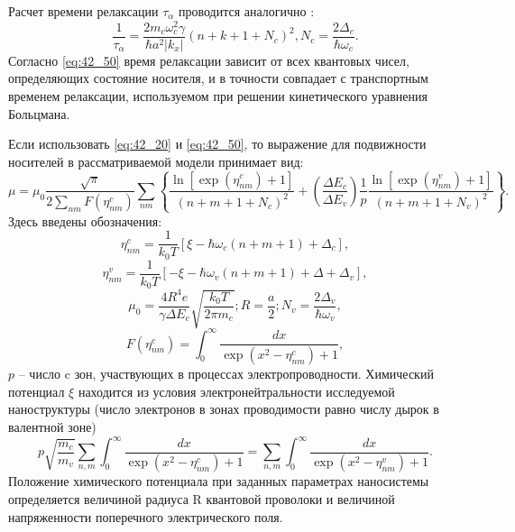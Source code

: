 Расчет времени релаксации $\tau _{\alpha } $ проводится аналогично \cite{Karapetyan2011}:
\begin{equation} \label{eq:42_50}
\frac{1}{\tau _{\alpha } } =\frac{2m_{c} \omega _{c}^{2} \gamma }{\hbar a^{2} \left|k_{x} \right|} \left(n+k+1+N_{c} \right)^{2} , N_{c} =\frac{2\Delta _{c} }{\hbar \omega _{c} } .
\end{equation} 
Согласно \eqref{eq:42_50} время релаксации зависит от всех квантовых чисел, определяющих состояние носителя, и в точности совпадает с транспортным временем релаксации, используемом при решении кинетического уравнения Больцмана.

Если использовать \eqref{eq:42_20} и \eqref{eq:42_50}, то выражение для подвижности носителей в рассматриваемой модели принимает вид:
\begin{equation} \label{eq:42_60}
\mu =\mu _{0} \frac{\sqrt{\pi } }{2\sum _{nm}F(\eta _{nm}^{c} ) } \sum _{nm}\left\{\frac{\ln \left[\exp \left(\eta _{nm}^{c} \right)+1\right]}{\left(n+m+1+N_{c} \right)^{2} } +\left(\frac{\Delta E_{c} }{\Delta E_{v} } \right)\frac{1}{p} \frac{\ln \left[\exp \left(\eta _{nm}^{v} \right)+1\right]}{\left(n+m+1+N_{v} \right)^{2} } \right\} . 
\end{equation} 
Здесь введены обозначения:
\[
\eta _{nm}^{c} =\frac{1}{k_{0} T} \left[\xi -\hbar \omega _{c} \left(n+m+1\right)+\Delta _{c} \right],\] 
\[\eta _{nm}^{v} =\frac{1}{k_{0} T} \left[-\xi -\hbar \omega _{v} \left(n+m+1\right)+\Delta +\Delta _{v} \right],
\] 
\[
\mu _{0} =\frac{4R^{4} e}{\gamma \Delta E_{c} } \sqrt{\frac{k_{0} T}{2\pi m_{c} } } ; R=\frac{a}{2} ; N_{v} =\frac{2\Delta _{v} }{\hbar \omega _{v} } ,
\] 
\[
F(\eta _{nm}^{c} )=\int _{0}^{\infty }\frac{dx}{\exp \left(x^{2} -\eta _{nm}^{c} \right)+1}  ,
\] 
$p$ -- число c зон, участвующих в процессах электропроводности. Химический потенциал $\xi $ находится из условия электронейтральности исследуемой наноструктуры (число электронов в зонах проводимости равно числу дырок в валентной зоне)
\begin{equation} \label{eq:42_70}
p\sqrt{\frac{m_{c} }{m_{v} } } \sum _{n,m}\int _{0}^{\infty }\frac{dx}{\exp \left(x^{2} -\eta _{nm}^{c} \right)+1}   =\sum _{n,m}\int _{0}^{\infty }\frac{dx}{\exp \left(x^{2} -\eta _{nm}^{v} \right)+1}. 
\end{equation} 
Положение химического потенциала при заданных параметрах наносистемы определяется величиной радиуса R квантовой проволоки и величиной напряженности поперечного электрического поля.

